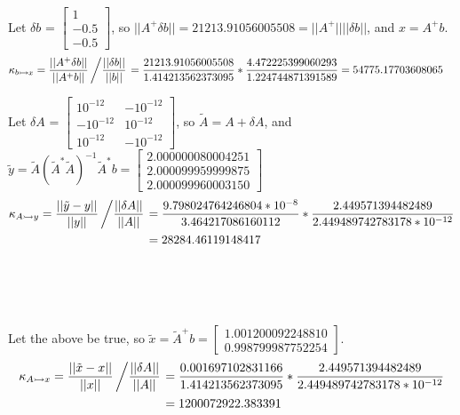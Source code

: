 \documentclass[12pt]{article}
\begin{document}
\begin{enumerate}[label = (\alph*)]
		\\ \\
		Let $\delta b$ =
		$
		\begin{bmatrix}
		1 \\ -0.5 \\ -0.5	
		\end{bmatrix}
		$, so $||A^+ \delta b || = 21213.91056005508 = ||A^+||||\delta b ||$, and $x = A^+b$.
			\begin{align*}
				\kappa_{b \rightarrowtail x} &= \frac{||A^+\delta b||}{||A^+ b||} \left/ \frac{||\delta b||}{||b||}\right. = \frac{21213.91056005508}{1.414213562373095} * \frac{4.472225399060293}{1.224744871391589} = 54775.17703608065
			\end{align*}
		\newpage 
		
		Let $\delta A$ = 
		$
		\begin{bmatrix}
			10^{-12} & -10^{-12} \\
			-10^{-12} & 10^{-12} \\
			10^{-12} & -10^{-12}
		\end{bmatrix}
		$, so $\tilde{A} = A + \delta A$, and $\tilde{y} = \tilde{A}(\tilde{A}^*\tilde{A})^{-1}\tilde{A}^*b = 
		\begin{bmatrix}
			2.000000080004251 \\
			2.000099959999875 \\
			2.000099960003150
		\end{bmatrix}$
		\begin{align*}
			\kappa_{A \rightarrowtail y} = \frac{||\tilde{y} - y||}{||y||}\left/ \frac{||\delta A||}{||A||}\right. &= \frac{9.798024764246804 * 10^{-8}}{3.464217086160112} * \frac{2.449571394482489}{2.449489742783178 * 10^{-12}} \\
			&= 28284.46119148417
		\end{align*}
		\\ \\ \\ \\
		Let the above be true, so $\tilde{x} = \tilde{A}^+b =
		\begin{bmatrix}
			1.001200092248810 \\
			0.998799987752254
		\end{bmatrix}$.
		\begin{align*}
			\kappa_{A \rightarrowtail x} = \frac{||\tilde{x} - x ||}{||x||} \left/ \frac{||\delta A||}{||A||}\right. &= \frac{0.001697102831166}{1.414213562373095} * \frac{2.449571394482489}{2.449489742783178 * 10^{-12}} \\
			&= 1200072922.383391
		\end{align*}
	\end{enumerate}
\end{document}

